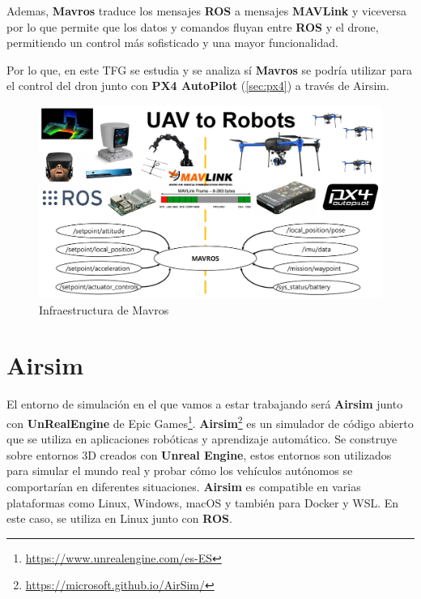Ademas, \textbf{Mavros} traduce los mensajes \textbf{ROS} a mensajes \textbf{MAVLink} y viceversa por lo que permite que los datos y comandos fluyan entre \textbf{ROS} y el drone, 
permitiendo un control más sofisticado y una mayor funcionalidad. 

Por lo que, en este TFG se estudia y se analiza sí \textbf{Mavros} se podría utilizar para el control del dron junto con \textbf{PX4 AutoPilot} (\ref{sec:px4}) a través
de Airsim. 

\begin{figure} [H]
  \begin{center}
    \includegraphics[scale=0.3]{figs/Plataformas_Desarollo/mavros.jpg}
  \end{center}
  \caption{Infraestructura de Mavros}
  \label{fig:InfraROS}
  \vspace{-1.5em}
\end{figure}

\section{Airsim}
\label{sec:Airsim}
El entorno de simulación en el que vamos a estar trabajando será \textbf{Airsim} junto con \textbf{UnRealEngine} de Epic Games\footnote{\url{https://www.unrealengine.com/es-ES}}. \textbf{Airsim}\footnote{\url{https://microsoft.github.io/AirSim/}} es un simulador de código abierto que se utiliza en aplicaciones robóticas 
y aprendizaje automático.
Se construye sobre entornos 3D creados con \textbf{Unreal Engine}, estos entornos son utilizados para simular el mundo real y probar 
cómo los vehículos autónomos se comportarían en diferentes situaciones. \textbf{Airsim} es compatible en varias plataformas como Linux, Windows, macOS y también para Docker y WSL. En este caso, se utiliza en Linux junto
con \textbf{ROS}. 

